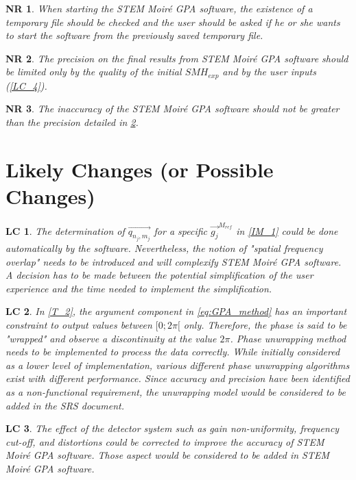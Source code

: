 \documentclass[12pt]{article}
\newcommand{\progname}{STEM Moir{\'e} GPA}
\newtheorem{NR}{NR}
\newtheorem{LC}{LC}
\begin{document}
\begin{NR}
\label{NR_7} 
\normalfont When starting the \progname{} software, the existence of a temporary file should be checked and the user should be asked if he or she wants to start the software from the previously saved temporary file.
\end{NR}

\begin{NR}
\label{NR_8} 
\normalfont The precision on the final results from \progname{} software should be limited only by the quality of the initial $SMH_{exp}$ and by the user inputs (\cref{LC_4}).
\end{NR}

\begin{NR}
\label{NR_9} 
\normalfont The inaccuracy of the \progname{} software should not be greater than the precision detailed in \cref{NR_8}.
\end{NR}

\section{Likely Changes (or Possible Changes)}    

\begin{LC}
\label{LC_1}
\normalfont The determination of $\overrightarrow{q_{n_j,m_j}}$ for a specific $\overrightarrow{g_j}^{M_{ref}}$ in \cref{IM_1} could be done automatically by the software. Nevertheless, the notion of "spatial frequency overlap" needs to be introduced and will complexify \progname{} software. A decision has to be made between the potential simplification of the user experience and the time needed to implement the simplification.
\end{LC}

\begin{LC}
\label{LC_2}
\normalfont In \cref{T_2}, the argument component in \cref{eq:GPA_method} has an important constraint to output values between $[0;2\pi[$ only. Therefore, the phase is said to be "wrapped" and observe a discontinuity at the value $2\pi$. Phase unwrapping method needs to be implemented to process the data correctly. While initially considered as a lower level of implementation, various different phase unwrapping algorithms exist with different performance. Since accuracy and precision have been identified as a non-functional requirement, the unwrapping model would be considered to be added in the SRS document. 
\end{LC}

\begin{LC}
\label{LC_3}
\normalfont The effect of the detector system such as gain non-uniformity, frequency cut-off, and distortions could be corrected to improve the accuracy of \progname{} software. Those aspect would be considered to be added in \progname{} software.
\end{LC}
\end{document}
